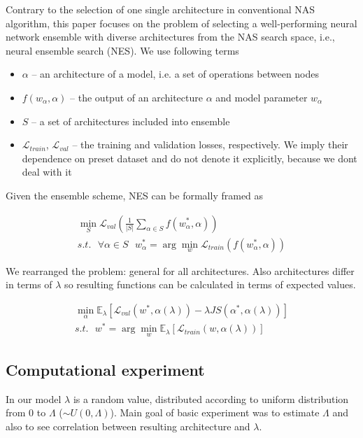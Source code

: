 \documentclass{article}
\begin{document}
Contrary to the selection of one single architecture in conventional NAS algorithm, this paper focuses on the problem of selecting a well-performing neural network ensemble with diverse architectures from the NAS search space, i.e., neural ensemble search (NES). We use following terms
\begin{itemize}
    \item $\alpha$ -- an architecture of a model, i.e. a set of operations between nodes
    \item $f(w_\alpha, \alpha)$ -- the output of an architecture $\alpha$ and model parameter $w_\alpha$
    \item $S$ -- a set of architectures included into ensemble
    \item $\mathcal{L}_{train}$, $\mathcal{L}_{val}$ -- the training and validation losses, respectively. We imply their dependence on preset dataset and do not denote it explicitly, because we dont deal with it
\end{itemize}

Given the ensemble scheme, NES can be formally framed as

\begin{gather*}
	\min_S \mathcal{L}_{val}\left(\frac{1}{|S|}\sum_{\alpha \in S}f(w_\alpha^*, \alpha)\right) \\
s.t. \text{ }\forall \alpha \in S \text{ } w_\alpha^* = \arg \min_w \mathcal{L}_{train}(f(w_\alpha^*, \alpha))
\end{gather*}

We rearranged the problem:  general for all architectures. Also architectures differ in terms of $\lambda$ so resulting functions can be calculated in terms of expected values.

\begin{gather*}
    \min_{\alpha} \mathbb{E}_\lambda [\mathcal{L}_{val}(w^*, \alpha(\lambda)) - \lambda JS(\alpha^*, \alpha(\lambda))] \\
    s.t. \text{ } w^* = \arg \min_w \mathbb{E}_\lambda[\mathcal{L}_{train}(w, \alpha(\lambda))]
\end{gather*}

\subsection{Computational experiment}

In our model $\lambda$ is a random value, distributed according to uniform distribution from 0 to $\Lambda$ ($\sim U(0, \Lambda)$). Main goal of basic experiment was to estimate $\Lambda$ and also to see correlation between resulting architecture and $\lambda$.
\end{document}

